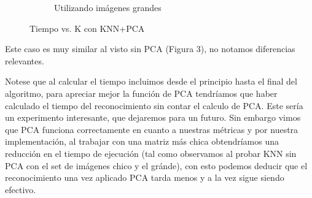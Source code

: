 \begin{figure}[H]
\begin{subfigure}[h]{0.62\linewidth}
\caption{Utilizando imágenes grandes}
\end{subfigure}%
\caption{Tiempo vs. K con KNN+PCA}
\end{figure}
Este caso es muy similar al visto sin PCA (Figura 3), no notamos diferencias relevantes.

Notese que al calcular el tiempo incluimos desde el principio hasta el final del algoritmo, para apreciar mejor la función de PCA tendríamos que haber calculado el tiempo del reconocimiento sin contar el calculo de PCA. Este sería un experimento interesante, que dejaremos para un futuro.\newline
Sin embargo vimos que PCA funciona correctamente en cuanto a nuestras métricas y por nuestra implementación, al trabajar con una matriz más chica obtendríamos una reducción en el tiempo de ejecución (tal como observamos al probar KNN sin PCA con el set de imágenes chico y el gránde), con esto podemos deducir que el reconocimiento una vez aplicado PCA tarda menos y a la vez sigue siendo efectivo.


